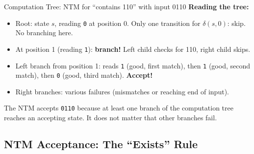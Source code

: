 \documentclass[11pt,a4paper]{article}
\newcommand{\kt}[1]{\par\vspace{0.3em}\colorbox{yellow!60}{\parbox{\dimexpr\linewidth-2\fboxsep}{#1}}\vspace{0.3em}}
\begin{document}
\begin{examplebox}{{Computation Tree: NTM for ``contains 110'' with input 0110}}
\textbf{Reading the tree:}
\begin{itemize}[nosep]
\item Root: state $s$, reading \texttt{0} at position 0. Only one transition for $\delta(s, 0)$: skip. No branching here.
\item At position 1 (reading \texttt{1}): \textbf{branch!} Left child checks for 110, right child skips.
\item Left branch from position 1: reads \texttt{1} (good, first match), then \texttt{1} (good, second match), then \texttt{0} (good, third match). \textbf{Accept!}
\item Right branches: various failures (mismatches or reaching end of input).
\end{itemize}

\kt{The NTM accepts \texttt{0110} because at least one branch of the computation tree reaches an accepting state. It does not matter that other branches fail.}
\end{examplebox}

\subsection{NTM Acceptance: The ``Exists'' Rule}
\end{document}
